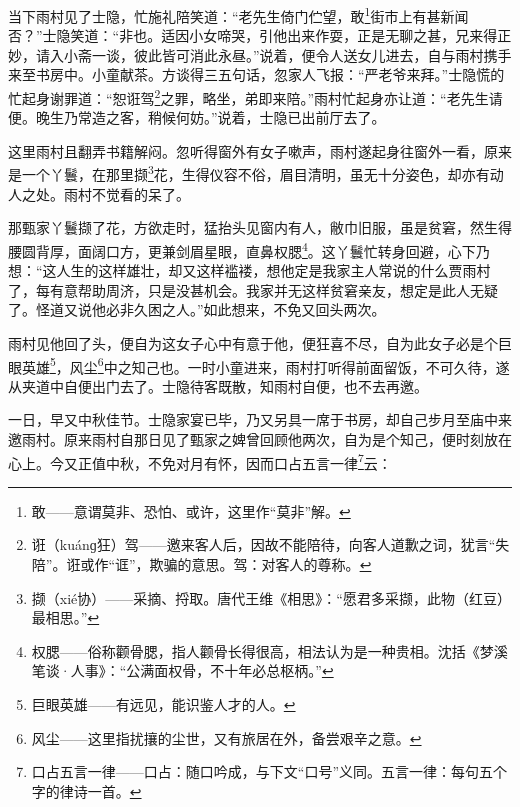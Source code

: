 \par 当下雨村见了士隐，忙施礼陪笑道：“老先生倚门伫望，敢\footnote{敢——意谓莫非、恐怕、或许，这里作“莫非”解。}街市上有甚新闻否？”士隐笑道：“非也。适因小女啼哭，引他出来作耍，正是无聊之甚，兄来得正妙，请入小斋一谈，彼此皆可消此永昼。”说着，便令人送女儿进去，自与雨村携手来至书房中。小童献茶。方谈得三五句话，忽家人飞报：“严老爷来拜。”士隐慌的忙起身谢罪道：“恕诳驾\footnote{诳（kuánɡ狂）驾——邀来客人后，因故不能陪待，向客人道歉之词，犹言“失陪”。诳或作“诓”，欺骗的意思。驾：对客人的尊称。}之罪，略坐，弟即来陪。”雨村忙起身亦让道：“老先生请便。晚生乃常造之客，稍候何妨。”说着，士隐已出前厅去了。
\par 这里雨村且翻弄书籍解闷。忽听得窗外有女子嗽声，雨村遂起身往窗外一看，原来是一个丫鬟，在那里撷\footnote{撷（xié协）——采摘、捋取。唐代王维《相思》：“愿君多采撷，此物（红豆）最相思。”}花，生得仪容不俗，眉目清明，虽无十分姿色，却亦有动人之处。雨村不觉看的呆了。
\par 那甄家丫鬟撷了花，方欲走时，猛抬头见窗内有人，敝巾旧服，虽是贫窘，然生得腰圆背厚，面阔口方，更兼剑眉星眼，直鼻权腮\footnote{权腮——俗称颧骨腮，指人颧骨长得很高，相法认为是一种贵相。沈括《梦溪笔谈·人事》：“公满面权骨，不十年必总枢柄。”}。这丫鬟忙转身回避，心下乃想：“这人生的这样雄壮，却又这样褴褛，想他定是我家主人常说的什么贾雨村了，每有意帮助周济，只是没甚机会。我家并无这样贫窘亲友，想定是此人无疑了。怪道又说他必非久困之人。”如此想来，不免又回头两次。
\par 雨村见他回了头，便自为这女子心中有意于他，便狂喜不尽，自为此女子必是个巨眼英雄\footnote{巨眼英雄——有远见，能识鉴人才的人。}，风尘\footnote{风尘——这里指扰攘的尘世，又有旅居在外，备尝艰辛之意。}中之知己也。一时小童进来，雨村打听得前面留饭，不可久待，遂从夹道中自便出门去了。士隐待客既散，知雨村自便，也不去再邀。
\par 一日，早又中秋佳节。士隐家宴已毕，乃又另具一席于书房，却自己步月至庙中来邀雨村。原来雨村自那日见了甄家之婢曾回顾他两次，自为是个知己，便时刻放在心上。今又正值中秋，不免对月有怀，因而口占五言一律\footnote{口占五言一律——口占：随口吟成，与下文“口号”义同。五言一律：每句五个字的律诗一首。}云：
